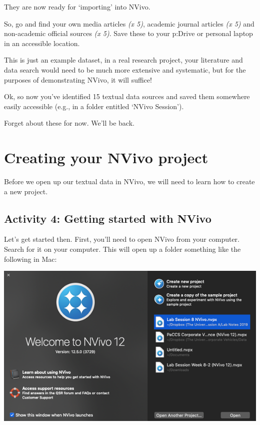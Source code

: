 \documentclass[
]{book}
\begin{document}
They are now ready for `importing' into NVivo.

So, go and find your own media articles \emph{(x 5)}, academic journal articles \emph{(x 5)} and non-academic official sources \emph{(x 5)}. Save these to your p:Drive or personal laptop in an accessible location.

This is just an example dataset, in a real research project, your literature and data search would need to be much more extensive and systematic, but for the purposes of demonstrating NVivo, it will suffice!

Ok, so now you've identified 15 textual data sources and saved them somewhere easily accessible (e.g., in a folder entitled `NVivo Session').

Forget about these for now. We'll be back.

\hypertarget{creating-your-nvivo-project}{%
\section{Creating your NVivo project}\label{creating-your-nvivo-project}}

Before we open up our textual data in NVivo, we will need to learn how to create a new project.

\hypertarget{activity-4-getting-started-with-nvivo}{%
\subsection{Activity 4: Getting started with NVivo}\label{activity-4-getting-started-with-nvivo}}

Let's get started then. First, you'll need to open NVivo from your computer. Search for it on your computer. This will open up a folder something like the following in Mac:

\includegraphics{imgs/welcome_mac.png}
\end{document}

